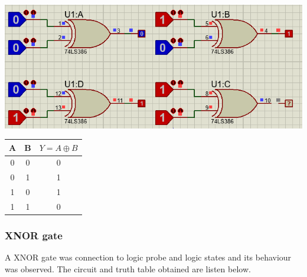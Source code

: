 \documentclass[a4paper, 12pt]{article}
\begin{document}
\begin{minipage}[c]{.7\textwidth}
  \centering
  \includegraphics[scale=0.5]{xor}
\end{minipage}
\begin{minipage}{.3\textwidth}
  \begin{center}
    \begin{tabular}{ |c|c|c| }
      \hline
      A & B & $Y=A\oplus B$ \\
      \hline
      0 & 0 & 0 \\
      \hline
      0 & 1 & 1 \\
      \hline
      1 & 0 & 1 \\
      \hline
      1 & 1 & 0 \\
      \hline
    \end{tabular}
  \end{center}
\end{minipage}


\subsubsection{XNOR gate}
A XNOR gate was connection to logic probe and logic states and its behaviour was observed.
The circuit and truth table obtained are listen below. \\
\end{document}
